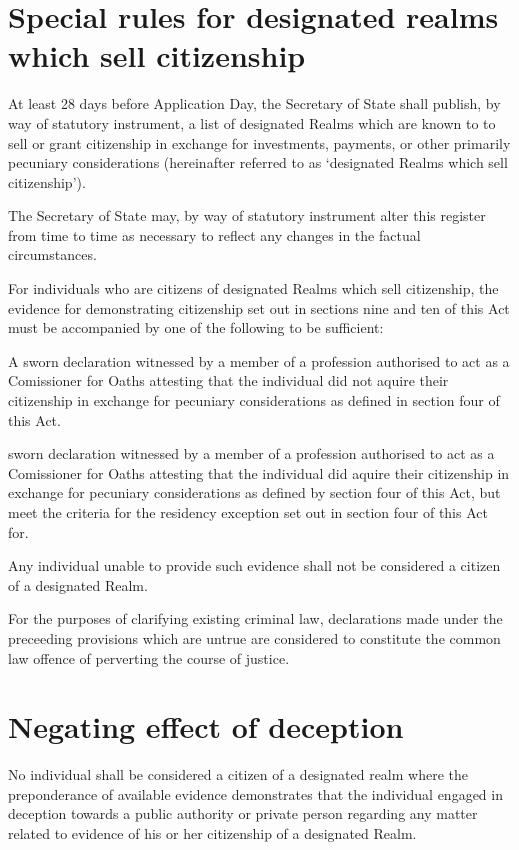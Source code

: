 \documentclass[private]{ukbill}
\begin{document}
\section{Special rules for designated realms which sell citizenship}
\begin{numstat}
	\item At least 28 days before Application Day, the Secretary of State shall publish, by way of statutory instrument, a list of designated Realms which are known to  to sell or grant citizenship in exchange for investments, payments, or other primarily pecuniary considerations (hereinafter referred to as `designated Realms which sell citizenship').
	\item The Secretary of State may, by way of statutory instrument alter this register from time to time as necessary to reflect any changes in the factual circumstances.
	\item For individuals who are citizens of designated Realms which sell citizenship, the evidence for demonstrating citizenship set out in sections nine and ten of this Act must be accompanied by one of the following to be sufficient:
	\begin{alphstat}
		\item A sworn declaration witnessed by a member of a profession authorised to act as a Comissioner for Oaths attesting that the individual did not aquire their citizenship in exchange for pecuniary considerations as defined in section four of this Act.
		\item  sworn declaration witnessed by a member of a profession authorised to act as a Comissioner for Oaths attesting that the individual did aquire their citizenship in exchange for pecuniary considerations as defined by section four of this Act, but meet the criteria for the residency exception set out in section four of this Act for.
	\end{alphstat} 	   
	\item Any individual unable to provide such evidence shall not be considered a citizen of a designated Realm.
	\item For the purposes of clarifying existing criminal law, declarations made under the preceeding provisions which are untrue are considered to constitute the common law offence of perverting the course of justice.
	
\end{numstat}
\section{Negating effect of deception}
\begin{nostat}
	\item  No individual shall be considered a citizen of a designated realm where the preponderance of available evidence demonstrates that the individual engaged in deception towards a public authority or private person regarding any matter related to evidence of his or her citizenship of a designated Realm.
\end{nostat}
\end{document}
